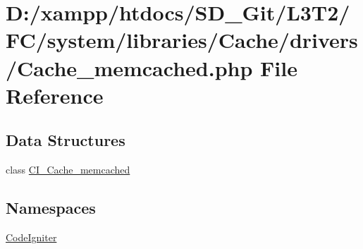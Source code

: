 \hypertarget{_cache__memcached_8php}{}\section{D\+:/xampp/htdocs/\+S\+D\+\_\+\+Git/\+L3\+T2/\+F\+C/system/libraries/\+Cache/drivers/\+Cache\+\_\+memcached.php File Reference}
\label{_cache__memcached_8php}
\subsection*{Data Structures}
\begin{DoxyCompactItemize}
\item 
class \hyperlink{class_c_i___cache__memcached}{C\+I\+\_\+\+Cache\+\_\+memcached}
\end{DoxyCompactItemize}
\subsection*{Namespaces}
\begin{DoxyCompactItemize}
\item 
 \hyperlink{namespace_code_igniter}{Code\+Igniter}
\end{DoxyCompactItemize}
